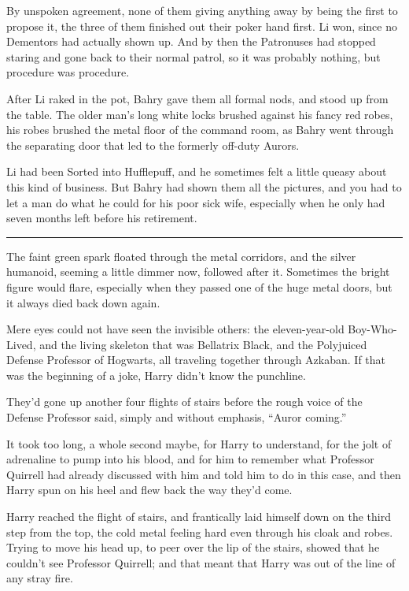 By unspoken agreement, none of them giving anything away by being the first to propose it, the three of them finished out their poker hand first. Li won, since no Dementors had actually shown up. And by then the Patronuses had stopped staring and gone back to their normal patrol, so it was probably nothing, but procedure was procedure.

After Li raked in the pot, Bahry gave them all formal nods, and stood up from the table. The older man's long white locks brushed against his fancy red robes, his robes brushed the metal floor of the command room, as Bahry went through the separating door that led to the formerly off-duty Aurors.

Li had been Sorted into Hufflepuff, and he sometimes felt a little queasy about this kind of business. But Bahry had shown them all the pictures, and you had to let a man do what he could for his poor sick wife, especially when he only had seven months left before his retirement.

\begin{center}\rule{3in}{0.4pt}\end{center}

The faint green spark floated through the metal corridors, and the silver humanoid, seeming a little dimmer now, followed after it. Sometimes the bright figure would flare, especially when they passed one of the huge metal doors, but it always died back down again.

Mere eyes could not have seen the invisible others: the eleven-year-old Boy-Who-Lived, and the living skeleton that was Bellatrix Black, and the Polyjuiced Defense Professor of Hogwarts, all traveling together through Azkaban. If that was the beginning of a joke, Harry didn't know the punchline.

They'd gone up another four flights of stairs before the rough voice of the Defense Professor said, simply and without emphasis, ``Auror coming.''

It took too long, a whole second maybe, for Harry to understand, for the jolt of adrenaline to pump into his blood, and for him to remember what Professor Quirrell had already discussed with him and told him to do in this case, and then Harry spun on his heel and flew back the way they'd come.

Harry reached the flight of stairs, and frantically laid himself down on the third step from the top, the cold metal feeling hard even through his cloak and robes. Trying to move his head up, to peer over the lip of the stairs, showed that he couldn't see Professor Quirrell; and that meant that Harry was out of the line of any stray fire.

